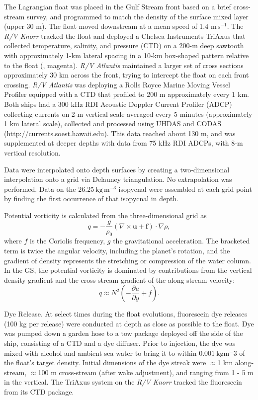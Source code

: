 \documentclass{natureJMK}
\begin{document}
The Lagrangian float was placed in the Gulf Stream front based on a brief cross-stream survey, and programmed to match the density of the surface mixed layer (upper 30 m).  The float moved downstream at a mean speed of 1.4 $\mathrm{m\,s^{-1}}$.  The \emph{R/V Knorr} tracked the float and deployed a Chelsea Instruments TriAxus that  collected temperature, salinity, and pressure (CTD) on a 200-m deep sawtooth with approximately 1-km lateral spacing in a 10-km box-shaped pattern relative to the float (, magenta).  \emph{R/V Atlantis} maintained a larger set of cross sections approximately 30 km across the front, trying to intercept the float on each front crossing.  \emph{R/V Atlantis} was deploying a Rolls Royce Marine Moving Vessel Profiler equipped with a CTD that profiled to 200 m approximately every 1 km.  Both ships had a 300 kHz RDI Acoustic Doppler Current Profiler (ADCP) collecting currents on 2-m vertical scale averaged every 5 minutes (approximately 1 km lateral scale), collected and processed using UHDAS and CODAS (http://currents.soest.hawaii.edu\cite{firingetal12}).  This data reached about 130 m, and was supplemented at deeper depths with data from 75 kHz RDI ADCPs, with 8-m vertical resolution.  

Data were interpolated onto depth surfaces by creating a two-dimensional interpolation onto a grid via Delauney triangulation. No extrapolation was performed.  Data on the $26.25\ \mathrm{kg\,m^{-3}}$ isopycnal were assembled at each grid point by finding the first occurrence of that isopycnal in depth.  

Potential vorticity is calculated from the three-dimensional grid as
\begin{equation}
  q = -\frac{g}{\rho_0}\left(\nabla \times\mathbf{u}+\mathbf{f}\right) \cdot \nabla\rho,
\end{equation}
where $f$ is the Coriolis frequency, $g$ the gravitational acceleration. The bracketed term is twice the angular velocity, including the planet's rotation, and the gradient of density represents the stretching or compression of the water column.  In the GS, the potential vorticity is dominated by contributions from the vertical density gradient and the cross-stream gradient of the along-stream velocity:
\begin{equation}
  q \approx N^2\left(-\frac{\partial u}{\partial y}+f\right).
\end{equation}

Dye Release. At select times during the float evolutions, fluorescein dye releases (100 kg per release) were conducted at depth as close as possible to the float.  Dye was pumped down a garden hose to a tow package deployed off the side of the ship, consisting of a CTD and a dye diffuser.  Prior to injection, the dye was mixed with alcohol and ambient sea water to bring it to within $0.001\ \mathrm{kg m^-3}$ of the float's target density. Initial dimensions of the dye streak were $\approx$1 km along-stream, $\approx$100 m cross-stream (after wake adjustment), and ranging from 1 - 5 m in the vertical. The TriAxus system on the \emph{R/V Knorr} tracked the fluorescein from its CTD package.  
\end{document}
